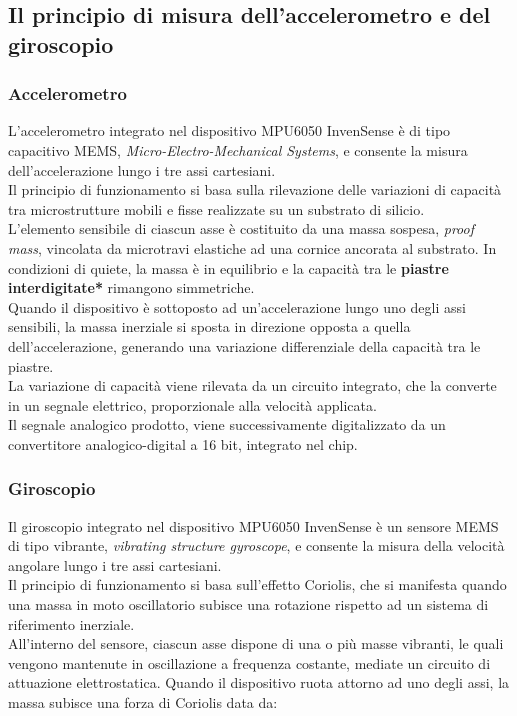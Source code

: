 \documentclass[11pt]{report}
\begin{document}
\subsection{Il principio di misura dell'accelerometro e del giroscopio}
\subsubsection{Accelerometro}
L'accelerometro integrato nel dispositivo MPU6050 InvenSense è di tipo capacitivo MEMS, \textit{Micro-Electro-Mechanical Systems}, e consente la misura dell'accelerazione lungo i tre assi cartesiani.\\
Il principio di funzionamento si basa sulla rilevazione delle variazioni di capacità tra microstrutture mobili e fisse realizzate su un substrato di silicio.\\
L'elemento sensibile di ciascun asse è costituito da una massa sospesa, \textit{proof mass}, vincolata da microtravi elastiche ad una cornice ancorata al substrato.
In condizioni di quiete, la massa è in equilibrio e la capacità tra le \textbf{piastre interdigitate*} rimangono simmetriche.\\
Quando il dispositivo è sottoposto ad un'accelerazione lungo uno degli assi sensibili, la massa inerziale si sposta in direzione opposta a quella dell'accelerazione, generando una variazione differenziale 
della capacità tra le piastre.\\
La variazione di capacità viene rilevata da un circuito integrato, che la converte in un segnale elettrico, proporzionale alla velocità applicata.\\
Il segnale analogico prodotto, viene successivamente digitalizzato da un convertitore analogico-digital a 16 bit, integrato nel chip.

\subsubsection{Giroscopio}
Il giroscopio integrato nel dispositivo MPU6050 InvenSense è un sensore MEMS di tipo vibrante, \textit{vibrating structure gyroscope}, e consente la misura della velocità angolare lungo i tre assi cartesiani.\\
Il principio di funzionamento si basa sull'effetto Coriolis, che si manifesta quando una massa in moto oscillatorio subisce una rotazione rispetto ad un sistema di riferimento inerziale.\\
All'interno del sensore, ciascun asse dispone di una o più masse vibranti, le quali vengono mantenute in oscillazione a frequenza costante, mediate un circuito di attuazione elettrostatica. Quando il dispositivo ruota attorno ad uno 
degli assi, la massa subisce una forza di Coriolis data da:
\end{document}
